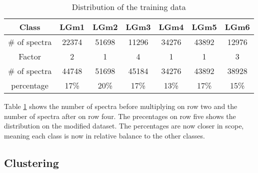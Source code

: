 \begin{table}[h!]
\centering
 \begin{tabular}{||c c c c c c c||} 
 \hline
 Class & LGm1 & LGm2 & LGm3 & LGm4 & LGm5 & LGm6 \\ [0.5ex] 
 \hline\hline
\# of spectra & 22374	& 51698	& 11296	& 34276	& 43892	& 12976 \\
 \hline 
 Factor  & 2 & 1 & 4 & 1 & 1 & 3 \\
 \hline 
 \# of spectra & 44748 & 51698 & 45184 & 34276 & 43892 & 38928 \\
 \hline
 percentage & 17\%& 20\% & 17\% & 13\% & 17\% & 15\% \\
 \hline

\end{tabular}
\caption{Distribution of the training data}
\label{table:3}
\end{table}

Table \ref{table:3} shows the number of spectra before multiplying on row two and the number of spectra after on row four. The precentages on row five shows the distribution on the modified dataset. The percentages are now closer in scope,  meaning each class is now in relative balance to the other classes.

\subsection{Clustering}


